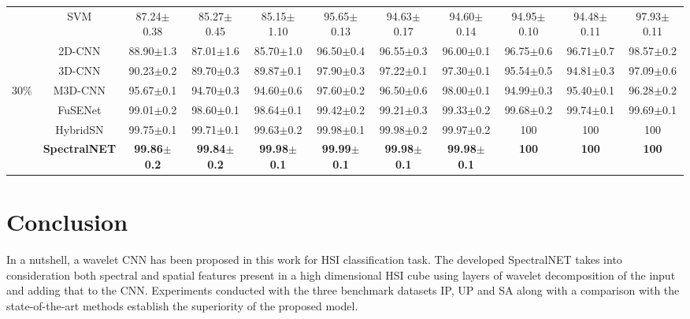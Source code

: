 \documentclass[journal]{IEEEtran}
\begin{document}
\begin{table*}
{\begin{tabular}{c | c | c c c | c c c | c c c}
         \hline
         \hline
        
         & SVM & 87.24$\pm$0.38 & 85.27$\pm$0.45 & 85.15$\pm$1.10 & 95.65$\pm$0.13 & 94.63$\pm$0.17 & 94.60$\pm$0.14 & 94.95$\pm$0.10 & 94.48$\pm$0.11 & 97.93$\pm$0.11 \\
         
         & 2D-CNN & 88.90$\pm$1.3 & 87.01$\pm$1.6 & 85.70$\pm$1.0 & 96.50$\pm$0.4 & 96.55$\pm$0.3 & 96.00$\pm$0.1 & 96.75$\pm$0.6 & 96.71$\pm$0.7 & 98.57$\pm$0.2 \\
         
         & 3D-CNN & 90.23$\pm$0.2 & 89.70$\pm$0.3 & 89.87$\pm$0.1 & 97.90$\pm$0.3 & 97.22$\pm$0.1 & 97.30$\pm$0.1 & 95.54$\pm$0.5 & 94.81$\pm$0.3 & 97.09$\pm$0.6 \\
         
        30\% & M3D-CNN & 95.67$\pm$0.1 & 94.70$\pm$0.3 & 94.60$\pm$0.6 & 97.60$\pm$0.2 & 96.50$\pm$0.6 & 98.00$\pm$0.1 & 94.99$\pm$0.3 & 95.40$\pm$0.1 & 96.28$\pm$0.2 \\
         
         & FuSENet & 99.01$\pm$0.2 & 98.60$\pm$0.1 & 98.64$\pm$0.1 & 99.42$\pm$0.2 & 99.21$\pm$0.3 & 99.33$\pm$0.2 & 99.68$\pm$0.2 & 99.74$\pm$0.1 & 99.69$\pm$0.1 \\
         
         & HybridSN & 99.75$\pm$0.1 & 99.71$\pm$0.1 & 99.63$\pm$0.2 & 99.98$\pm$0.1 & 99.98$\pm$0.2 & 99.97$\pm$0.2 & 100 & 100 & 100 \\
         
         & \textbf{SpectralNET} & \textbf{99.86$\pm$0.2} & \textbf{99.84$\pm$0.2} & \textbf{99.98$\pm$0.1} & \textbf{99.99$\pm$0.1} & \textbf{99.98$\pm$0.1} & \textbf{99.98$\pm$0.1} & \textbf{100} & \textbf{100} & \textbf{100}\\
         
         \hline
         \hline        
        \end{tabular}}
\end{table*}

\section{Conclusion}
In a nutshell, a wavelet CNN has been proposed in this work for HSI classification task. The developed SpectralNET takes into consideration both spectral and spatial features present in a high dimensional HSI cube using layers of wavelet decomposition of the input and adding that to the CNN. Experiments conducted with the three benchmark datasets IP, UP and SA along with a comparison with the state-of-the-art methods establish the superiority of the proposed model.
\end{document}
